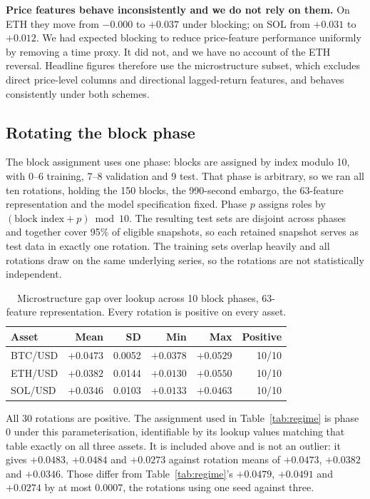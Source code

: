 \documentclass[11pt]{article}
\begin{document}
\textbf{Price features behave inconsistently and we do not rely on them.} On
ETH they move from $-0.000$ to $+0.037$ under blocking; on SOL from $+0.031$ to
$+0.012$. We had expected blocking to reduce price-feature performance
uniformly by removing a time proxy. It did not, and we have no account of the
ETH reversal. Headline figures therefore use the microstructure subset, which
excludes direct price-level columns and directional lagged-return features,
and behaves consistently under both schemes.

\subsection{Rotating the block phase}
\label{sec:rotation}

The block assignment uses one phase: blocks are assigned by index modulo 10,
with 0--6 training, 7--8 validation and 9 test. That phase is arbitrary, so we
ran all ten rotations, holding the 150 blocks, the 990-second embargo, the
63-feature representation and the model specification fixed. Phase $p$ assigns
roles by $(\text{block index} + p) \bmod 10$. The resulting test sets are
disjoint across phases and together cover 95\% of eligible snapshots, so each
retained snapshot serves as test data in exactly one rotation. The training
sets overlap heavily and all rotations draw on the same underlying series, so
the rotations are not statistically independent.

\begin{table}[ht]
\centering
\caption{Microstructure gap over lookup across 10 block phases, 63-feature
representation. Every rotation is positive on every asset.}
\label{tab:rotation}
\begin{tabular}{lrrrrr}
\toprule
Asset & Mean & SD & Min & Max & Positive \\
\midrule
BTC/USD & $+0.0473$ & 0.0052 & $+0.0378$ & $+0.0529$ & 10/10 \\
ETH/USD & $+0.0382$ & 0.0144 & $+0.0130$ & $+0.0550$ & 10/10 \\
SOL/USD & $+0.0346$ & 0.0103 & $+0.0133$ & $+0.0463$ & 10/10 \\
\bottomrule
\end{tabular}
\end{table}

\noindent
All 30 rotations are positive. The assignment used in Table~\ref{tab:regime} is
phase 0 under this parameterisation, identifiable by its lookup values matching
that table exactly on all three assets. It is included above and is not an
outlier: it gives $+0.0483$, $+0.0484$ and $+0.0273$ against rotation means of
$+0.0473$, $+0.0382$ and $+0.0346$. Those differ from Table~\ref{tab:regime}'s
$+0.0479$, $+0.0491$ and $+0.0274$ by at most 0.0007, the rotations using one
seed against three.
\end{document}
